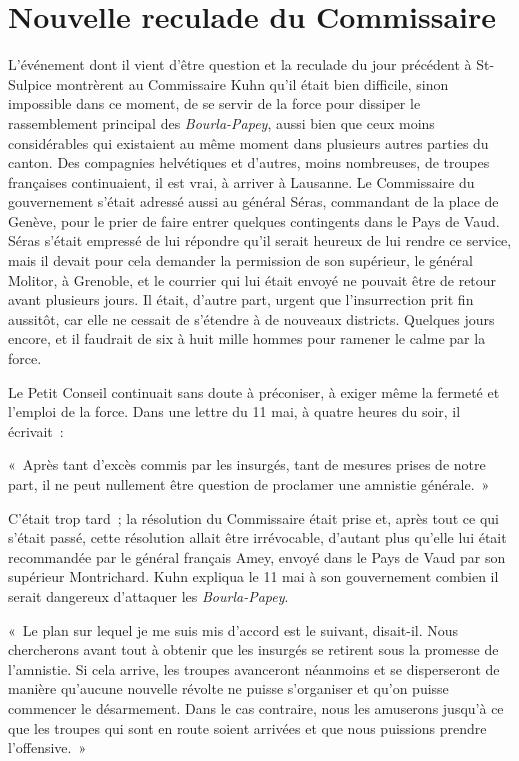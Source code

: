 \documentclass[french,twoside]{book} %
\newenvironment{quoteblock}%
  {\begin{quoting}}
  {\end{quoting}}
\newenvironment{quotebar}{%
    \def\FrameCommand{{\color{rubric!10!}\vrule width 0.5em} \hspace{0.9em}}%
    \def\OuterFrameSep{\itemsep} %
    \MakeFramed {\advance\hsize-\width \FrameRestore}
  }%
  {%
    \endMakeFramed
  }
\renewenvironment{quoteblock}%
  {%
    \savenotes
    \setstretch{0.9}
    \normalfont
    \begin{quotebar}
  }
  {%
    \end{quotebar}
    \spewnotes
  }
\begin{document}
\section[{Nouvelle reculade du Commissaire}]{Nouvelle reculade du Commissaire}
\noindent L’événement dont il vient d’être question et la reculade du jour précédent à St-Sulpice montrèrent au Commissaire Kuhn qu’il était bien difficile, sinon impossible dans ce moment, de se servir de la force pour dissiper le rassemblement principal des \emph{Bourla-Papey}, aussi bien que ceux moins considérables qui existaient au même moment dans plusieurs autres parties du canton. Des compagnies helvétiques et d’autres, moins nombreuses, de troupes françaises continuaient, il est vrai, à arriver à Lausanne. Le Commissaire du gouvernement s’était adressé aussi au général Séras, commandant de la place de Genève, pour le prier de faire entrer quelques contingents dans le Pays de Vaud. Séras s’était empressé de lui répondre qu’il serait heureux de lui rendre ce service, mais il devait pour cela demander la permission de son supérieur, le général Molitor, à Grenoble, et le courrier qui lui était envoyé ne pouvait être de retour avant plusieurs jours. Il était, d’autre part, urgent que l’insurrection prit fin aussitôt, car elle ne cessait de s’étendre à de nouveaux districts. Quelques jours encore, et il faudrait de six à huit mille hommes pour ramener le calme par la force.\par
Le Petit Conseil continuait sans doute à préconiser, à exiger même la fermeté et l’emploi de la force. Dans une lettre du 11 mai, à quatre heures du soir, il écrivait :\par

\begin{quoteblock}
\noindent « Après tant d’excès commis par les insurgés, tant de mesures prises de notre part, il ne peut nullement être question de proclamer une amnistie générale. »\end{quoteblock}

\noindent C’était trop tard ; la résolution du Commissaire était prise et, après tout ce qui s’était passé, cette résolution allait être irrévocable, d’autant plus qu’elle lui était recommandée par le général français Amey, envoyé dans le Pays de Vaud par son supérieur Montrichard. Kuhn expliqua le 11 mai à son gouvernement combien il serait dangereux d’attaquer les \emph{Bourla-Papey}.\par

\begin{quoteblock}
\noindent « Le plan sur lequel je me suis mis d’accord est le suivant, disait-il. Nous chercherons avant tout à obtenir que les insurgés se retirent sous la promesse de l’amnistie. Si cela arrive, les troupes avanceront néanmoins et se disperseront de manière qu’aucune nouvelle révolte ne puisse s’organiser et qu’on puisse commencer le désarmement. Dans le cas contraire, nous les amuserons jusqu’à ce que les troupes qui sont en route soient arrivées et que nous puissions prendre l’offensive. »\end{quoteblock}
\end{document}
